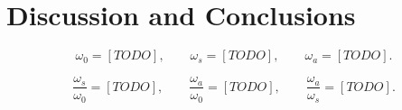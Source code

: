 \documentclass[a4paper,11pt]{article}
\begin{document}

\section{Discussion and Conclusions}

\begin{equation}
\omega_0 = [TODO], \qquad \omega_s = [TODO], \qquad \omega_a = [TODO].
\end{equation}

\begin{equation}
\frac{\omega_s}{\omega_0} = [TODO], \qquad
\frac{\omega_a}{\omega_0} = [TODO], \qquad
\frac{\omega_a}{\omega_s} = [TODO].
\end{equation}


\end{document}
